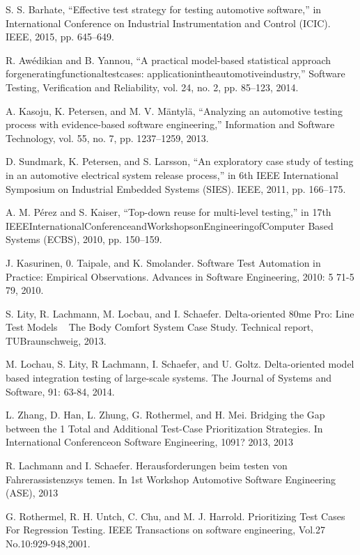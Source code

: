 \documentclass{article}
\begin{document}
\begin{thebibliography}{9}
S. S. Barhate, “Eﬀective test strategy for testing automotive software,” in International Conference on Industrial Instrumentation and Control (ICIC). IEEE, 2015, pp. 645–649. 

R. Awédikian and B. Yannou, “A practical model-based statistical approach forgeneratingfunctionaltestcases: applicationintheautomotiveindustry,” Software Testing, Veriﬁcation and Reliability, vol. 24, no. 2, pp. 85–123, 2014.

A. Kasoju, K. Petersen, and M. V. Mäntylä, “Analyzing an automotive testing process with evidence-based software engineering,” Information and Software Technology, vol. 55, no. 7, pp. 1237–1259, 2013. 

D. Sundmark, K. Petersen, and S. Larsson, “An exploratory case study of testing in an automotive electrical system release process,” in 6th IEEE International Symposium on Industrial Embedded Systems (SIES). IEEE, 2011, pp. 166–175. 

A. M. Pérez and S. Kaiser, “Top-down reuse for multi-level testing,” in 17th IEEEInternationalConferenceandWorkshopsonEngineeringofComputer Based Systems (ECBS), 2010, pp. 150–159. 

J. Kasurinen, 0. Taipale, and K. Smolander. Software Test Automation in Practice: Empirical Observations. Advances in Software Engineering, 2010: 5 71-5 79, 2010. 

S. Lity, R. Lachmann, M. Locbau, and I. Schaefer. Delta-oriented 80me Pro: Line Test Models ~ The Body Comfort System Case Study. Technical report, TUBraunschweig, 2013.

M. Lochau, S. Lity, R Lachmann, I. Schaefer, and U. Goltz. Delta-oriented model based integration testing of large-scale systems. The Journal of Systems and Software, 91: 63-84, 2014.

L. Zhang, D. Han, L. Zhung, G. Rothermel, and H. Mei. Bridging the Gap between the 1 Total and Additional Test-Case Prioritization Strategies. In International Conferenceon Software Engineering, 1091? 2013, 2013

R. Lachmann and I. Schaefer. Herausforderungen beim testen von Fahrerassistenzsys temen. In 1st Workshop Automotive Software Engineering (ASE), 2013

G. Rothermel, R. H. Untch, C. Chu, and M. J. Harrold. Prioritizing Test Cases For Regression Testing. IEEE Transactions on software engineering, Vol.27 No.10:929-948,2001.


\end{thebibliography}
\end{document}
